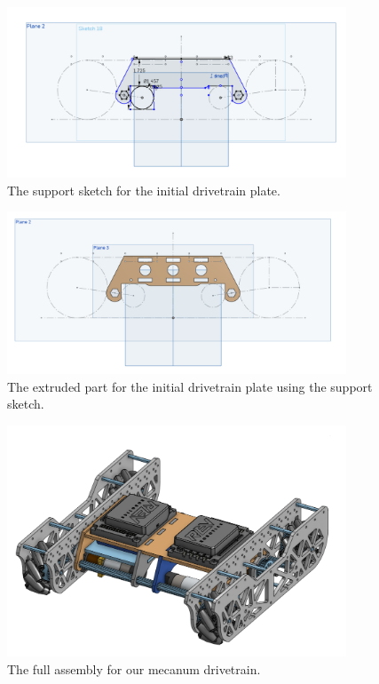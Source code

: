 \begin{figure}[htp]
\centering
\includegraphics[width=0.9\textwidth, angle=0]{Meetings/August/08-08-21/8-8-21_Image1-SupportSketch - Nathan Forrer.PNG}
\caption{The support sketch for the initial drivetrain plate.}
\label{fig:pic1}
\end{figure}

\begin{figure}[htp]
\centering
\includegraphics[width=0.9\textwidth, angle=0]{Meetings/August/08-08-21/8-8-21_Image2-SupportPart - Nathan Forrer.PNG}
\caption{The extruded part for the initial drivetrain plate using the support sketch.}
\label{fig:pic2}
\end{figure}

\begin{figure}[htp]
\centering
\includegraphics[width=0.9\textwidth, angle=0]{Meetings/August/08-08-21/8-8-21_Image3-Assembly1 - Nathan Forrer.PNG}
\caption{The full assembly for our mecanum drivetrain.}
\label{fig:pic3}
\end{figure}

